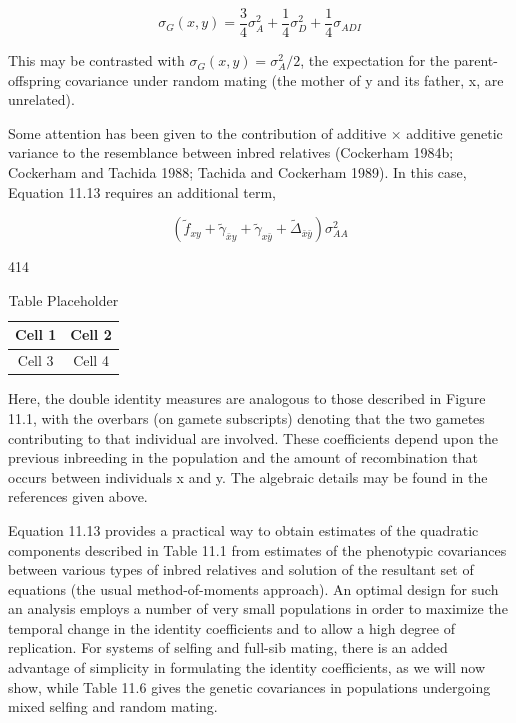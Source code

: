 \documentclass{article}
\begin{document}
\begin{equation}
\sigma_{G}(x,y)=\frac{3}{4}\sigma_{A}^{2}+\frac{1}{4}\sigma_{D}^{2}+\frac{1}{4}\sigma_{ADI}
\end{equation}

This may be contrasted with  $ \sigma_G(x, y) = \sigma_A^2/2 $, the expectation for the parent-offspring covariance under random mating (the mother of y and its father, x, are unrelated).

Some attention has been given to the contribution of additive × additive genetic variance to the resemblance between inbred relatives (Cockerham 1984b; Cockerham and Tachida 1988; Tachida and Cockerham 1989). In this case, Equation 11.13 requires an additional term,

\begin{equation}
\left(\widetilde{f}_{x y}+\widetilde{\gamma}_{\bar{x}y}+\widetilde{\gamma}_{x\bar{y}}+\widetilde{\Delta}_{\bar{x}\bar{y}}\right)\sigma_{A A}^{2}
\end{equation}

414

\begin{table}[h]
\centering
\begin{tabular}{|c|c|}
\hline
Cell 1 & Cell 2 \\
\hline
Cell 3 & Cell 4 \\
\hline
\end{tabular}
\caption{Table Placeholder}
\end{table}

Here, the double identity measures are analogous to those described in Figure 11.1, with the overbars (on gamete subscripts) denoting that the two gametes contributing to that individual are involved. These coefficients depend upon the previous inbreeding in the population and the amount of recombination that occurs between individuals x and y. The algebraic details may be found in the references given above.

Equation 11.13 provides a practical way to obtain estimates of the quadratic components described in Table 11.1 from estimates of the phenotypic covariances between various types of inbred relatives and solution of the resultant set of equations (the usual method-of-moments approach). An optimal design for such an analysis employs a number of very small populations in order to maximize the temporal change in the identity coefficients and to allow a high degree of replication. For systems of selfing and full-sib mating, there is an added advantage of simplicity in formulating the identity coefficients, as we will now show, while Table 11.6 gives the genetic covariances in populations undergoing mixed selfing and random mating.
\end{document}
